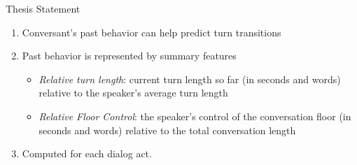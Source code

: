 \begin{frame} {Thesis Statement}
   \begin{enumerate}
         \item Conversant's past behavior can help predict turn transitions
         \item Past behavior is represented by summary features
         \begin{itemize}
            \item {\em Relative turn length}: current turn length so far (in seconds and words) relative to the speaker's average turn length
            \item {\em Relative Floor Control}: the speaker's control of the conversation floor (in seconds and words) relative to the total conversation length
         \end{itemize}
         \item Computed for each dialog act.
     \end{enumerate}
 \end{frame} 
 